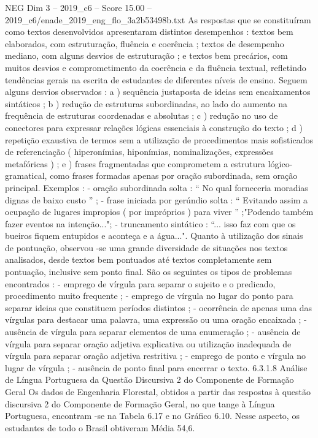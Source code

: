 \begin{textsample}{NEG Dim 3 – 2019\_c6 – Score 15.00 – 2019\_c6/enade\_2019\_eng\_flo\_3a2b53498b.txt}
As respostas que se constituíram como textos desenvolvidos apresentaram distintos desempenhos : textos bem elaborados, com estruturação, fluência e coerência ; textos de desempenho mediano, com alguns desvios de estruturação ; e textos bem precários, com muitos desvios e comprometimento da coerência e da fluência textual, refletindo tendências gerais na escrita de estudantes de diferentes níveis de ensino.
Seguem alguns desvios observados : a ) sequência justaposta de ideias sem encaixamentos sintáticos ; b ) redução de estruturas subordinadas, ao lado do aumento na frequência de estruturas coordenadas e absolutas ; c ) redução no uso de conectores para expressar relações lógicas essenciais à construção do texto ; d ) repetição exaustiva de termos sem a utilização de procedimentos mais sofisticados de referenciação ( hiperonímias, hiponímias, nominalizações, expressões metafóricas ) ; e ) frases fragmentadas que comprometem a estrutura lógico-gramatical, como frases formadas apenas por oração subordinada, sem oração principal.
Exemplos : - oração subordinada solta : “ No qual forneceria moradias dignas de baixo custo ” ; - frase iniciada por gerúndio solta : “ Evitando assim a ocupação de lugares impropios ( por impróprios ) para viver ” ;"Podendo também fazer eventos na intenção..."; - truncamento sintático : “... isso faz com que os bueiros fiquem entupidos e aconteça e a água...".
Quanto à utilização dos sinais de pontuação, observou -se uma grande diversidade de situações nos textos analisados, desde textos bem pontuados até textos completamente sem pontuação, inclusive sem ponto final.
São os seguintes os tipos de problemas encontrados : - emprego de vírgula para separar o sujeito e o predicado, procedimento muito frequente ; - emprego de vírgula no lugar do ponto para separar ideias que constituem períodos distintos ; - ocorrência de apenas uma das vírgulas para destacar uma palavra, uma expressão ou uma oração encaixada ; - ausência de vírgula para separar elementos de uma enumeração ; - ausência de vírgula para separar oração adjetiva explicativa ou utilização inadequada de vírgula para separar oração adjetiva restritiva ; - emprego de ponto e vírgula no lugar de vírgula ; - ausência de ponto final para encerrar o texto. 6.3.1.8 Análise de Língua Portuguesa da Questão Discursiva 2 do Componente de Formação Geral Os dados de Engenharia Florestal, obtidos a partir das respostas à questão discursiva 2 do Componente de Formação Geral, no que tange à Língua Portuguesa, encontram -se na Tabela 6.17 e no Gráfico 6.10.
Nesse aspecto, os estudantes de todo o Brasil obtiveram Média 54,6.

\end{textsample}
